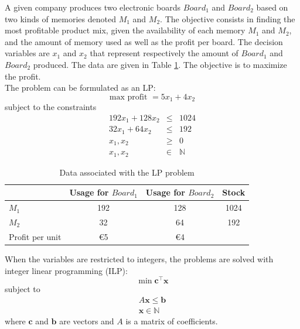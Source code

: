 \begin{example}
A given company produces two electronic boards $Board_1$ and $Board_2$ based on two kinds of memories denoted $M_1$ and $M_2$. The objective consists in finding the most profitable product mix, given the availability of each memory $M_1$ and $M_2$, and the amount of memory used as well as the profit per board. The decision variables are $x_1$ and $x_2$ that represent respectively the amount of $Board_1$ and $Board_2$ produced. The data are given in Table \ref{tab:ex_lp}. The objective is to maximize the profit.\\
The problem can be formulated as an LP:
\begin{equation}
\text{max profit } = 5x_1 + 4x_2
\end{equation}
subject to the constraints
\begin{eqnarray*}
192x_1 + 128 x_2 &\leq& 1024\\
32x_1 + 64 x_2 &\leq& 192\\
x_1, x_2 &\geq& 0\\
x_1, x_2 &\in& \mathbb{N}
\end{eqnarray*}
\end{example}

\begin{table}[h!]
\begin{center}
\caption{Data associated with the LP problem}
\begin{tabular}{|l|c|c|c|}
\hline
& Usage for $Board_1$ & Usage for $Board_2$ & Stock\\
\hline
$M_1$ & 192 & 128 & 1024 \\
$M_2$ & 32 & 64 & 192 \\
Profit per unit & \euro 5 & \euro 4 & \\
\hline
\end{tabular}
\label{tab:ex_lp}
\end{center}
\end{table}

When the variables are restricted to integers, the problems are solved with integer linear programming (ILP):
\begin{equation}
\min \mathbf{c}^\intercal\mathbf{x}
\end{equation}
subject to
\begin{equation*}
\begin{gathered}
A\mathbf{x} \leq \mathbf{b}\\
\mathbf{x} \in \mathbb{N}
\end{gathered}
\end{equation*}
where $\mathbf{c}$ and $\mathbf{b}$ are vectors and $A$ is a matrix of coefficients.

